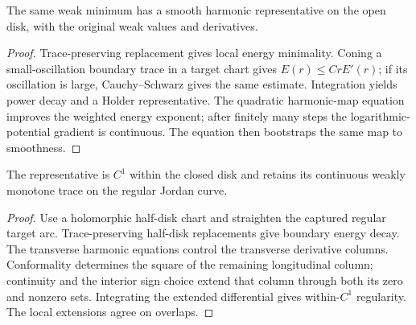 \begin{lemma}
\label{lem:annular-disk-interior}
The same weak minimum has a smooth harmonic representative on
the open disk, with the original weak values and derivatives.
\end{lemma}
\begin{proof}
Trace-preserving replacement gives local energy minimality.
Coning a small-oscillation boundary trace in a target chart gives
$E(r)\leq CrE'(r)$; if its oscillation is large, Cauchy--Schwarz
gives the same estimate. Integration yields power decay and a
Holder representative. The quadratic harmonic-map equation
improves the weighted energy exponent; after finitely many
steps the logarithmic-potential gradient is continuous.
The equation then bootstraps the same map to smoothness.
\end{proof}

\begin{lemma}
\label{lem:annular-disk-boundary}
The representative is $C^1$ within the closed disk and retains
its continuous weakly monotone trace on the regular Jordan curve.
\end{lemma}
\begin{proof}
Use a holomorphic half-disk chart and straighten the captured
regular target arc. Trace-preserving half-disk replacements give
boundary energy decay. The transverse harmonic equations control
the transverse derivative columns. Conformality determines the
square of the remaining longitudinal column; continuity and the
interior sign choice extend that column through both its zero and
nonzero sets. Integrating the extended differential gives
within-$C^1$ regularity. The local extensions agree on overlaps.
\end{proof}

